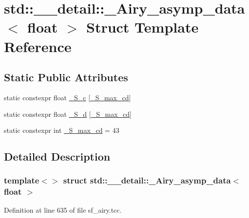 \hypertarget{structstd_1_1____detail_1_1__Airy__asymp__data_3_01float_01_4}{}\section{std\+:\+:\+\_\+\+\_\+detail\+:\+:\+\_\+\+Airy\+\_\+asymp\+\_\+data$<$ float $>$ Struct Template Reference}
\label{structstd_1_1____detail_1_1__Airy__asymp__data_3_01float_01_4}
\subsection*{Static Public Attributes}
\begin{DoxyCompactItemize}
\item 
static constexpr float \hyperlink{structstd_1_1____detail_1_1__Airy__asymp__data_3_01float_01_4_a8fc68acdbcbc59f4ecfdd4bc2f4f2a1e}{\+\_\+\+S\+\_\+c} \mbox{[}\hyperlink{structstd_1_1____detail_1_1__Airy__asymp__data_3_01float_01_4_ac0e59b83a90623587f20cdc32a9e7565}{\+\_\+\+S\+\_\+max\+\_\+cd}\mbox{]}
\item 
static constexpr float \hyperlink{structstd_1_1____detail_1_1__Airy__asymp__data_3_01float_01_4_ad947443d5860fcd25d25ad6d04ea3bb3}{\+\_\+\+S\+\_\+d} \mbox{[}\hyperlink{structstd_1_1____detail_1_1__Airy__asymp__data_3_01float_01_4_ac0e59b83a90623587f20cdc32a9e7565}{\+\_\+\+S\+\_\+max\+\_\+cd}\mbox{]}
\item 
static constexpr int \hyperlink{structstd_1_1____detail_1_1__Airy__asymp__data_3_01float_01_4_ac0e59b83a90623587f20cdc32a9e7565}{\+\_\+\+S\+\_\+max\+\_\+cd} = 43
\end{DoxyCompactItemize}


\subsection{Detailed Description}
\subsubsection*{template$<$$>$\newline
struct std\+::\+\_\+\+\_\+detail\+::\+\_\+\+Airy\+\_\+asymp\+\_\+data$<$ float $>$}



Definition at line 635 of file sf\+\_\+airy.\+tcc.



